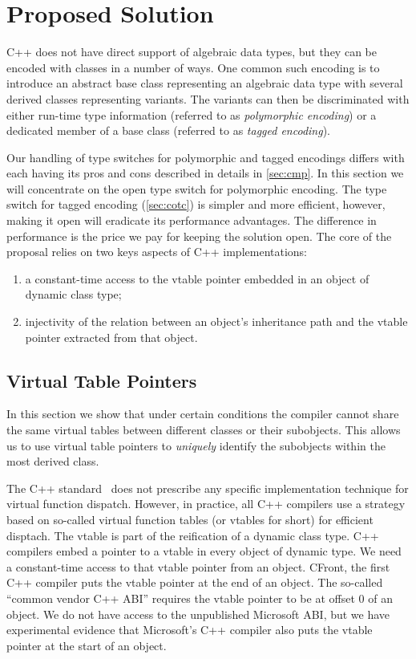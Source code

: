 \section{Proposed Solution}
\label{sec:copc}

C++ does not have direct support of algebraic data types, but they can be 
encoded with classes in a number of ways. One common such encoding is to 
introduce an abstract base class representing an algebraic data type with 
several derived classes representing variants. The variants can then be 
discriminated with either run-time type information (referred to as 
\emph{polymorphic encoding}) or a dedicated member of a base class 
(referred to  as \emph{tagged encoding}).

Our handling of type switches for polymorphic and tagged encodings differs 
with each having its pros and cons described in details in \textsection\ref{sec:cmp}.
In this section we will concentrate on the open type switch for 
polymorphic encoding. The type switch for tagged encoding (\textsection\ref{sec:cotc}) 
is simpler and more efficient, however, making it open will eradicate its 
performance advantages. The difference in performance is the price we pay for 
keeping the solution open.  The core of the proposal relies on two keys
aspects of C++ implementations:
\begin{enumerate}
\item a constant-time access to the vtable pointer embedded in an object of
  dynamic class type;
\item injectivity of the relation between an object's inheritance path
  and the vtable pointer extracted from that object.
\end{enumerate}

\subsection{Virtual Table Pointers}
\label{sec:vtp}

In this section we show that under certain conditions the compiler cannot share 
the same virtual tables between different classes or their subobjects. This 
allows us to use virtual table pointers to \emph{uniquely} identify the 
subobjects within the most derived class.

The C++ standard~\cite{C++0x} does not prescribe any specific 
implementation technique for virtual function dispatch.
However, in practice, all C++ compilers use a strategy based on so-called
virtual function tables (or vtables for short) for efficient disptach. 
The vtable is part of the reification of a dynamic class type.  
 C++ compilers embed a pointer to a vtable in every object of
dynamic type.  We need a constant-time access to that vtable pointer
from an object.  CFront, the first C++ compiler puts the vtable pointer
at the end of an object.  The so-called ``common vendor C++ ABI''
\cite{C++ABI} requires the vtable pointer to be at offset 0 of an object.
We do not have access to the unpublished Microsoft ABI, but we have
experimental evidence that Microsoft's C++ compiler also puts the vtable
pointer at the start of an object.

